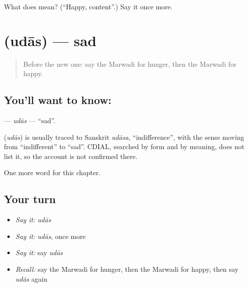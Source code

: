 \begin{tcolorbox}[breakable,colback=teal!4,colframe=teal!35!black,title={Before you move on}]
What does  mean? (\textquotedblleft{}Happy, content\textquotedblright{}.) Say it once more.
\end{tcolorbox}
\section[\texorpdfstring{\mw{उदास} (udās)}{उदास (udās)}]{ (udās) — sad}

\label{lesson:MW-C48-udas}



\begin{quote}
Before the new one: say the Marwadi for hunger, then the Marwadi for happy.
\end{quote}

\subsection*{You'll want to know: }
\textbf{} — \emph{udās} — \textquotedblleft{}sad\textquotedblright{}.

\begin{cousinweb}
\textbf{} (\emph{udās}) is usually traced to Sanskrit \emph{udāsa}, \textquotedblleft{}indifference\textquotedblright{}, with the sense moving from \textquotedblleft{}indifferent\textquotedblright{} to \textquotedblleft{}sad\textquotedblright{}. CDIAL, searched by form and by meaning, does not list it, so the account is not confirmed there.
\end{cousinweb}

\begin{grammarlens}[title={What you've built}]
One more word for this chapter.
\end{grammarlens}

\subsection*{Your turn}
\begin{itemize}
\raggedright
  \item \emph{Say it:} \emph{udās}
  \item \emph{Say it:} \emph{udās}, once more
  \item \emph{Say it:} say \emph{udās}
  \item \emph{Recall:} say the Marwadi for hunger, then the Marwadi for happy, then say \emph{udās} again
\end{itemize}

